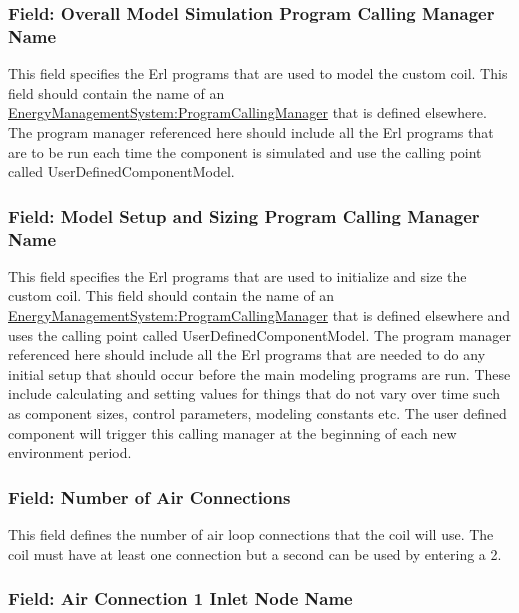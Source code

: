 \subsubsection{Field: Overall Model Simulation Program Calling Manager Name}\label{field-overall-model-simulation-program-calling-manager-name-2}

This field specifies the Erl programs that are used to model the custom coil. This field should contain the name of an \hyperref[energymanagementsystemprogramcallingmanager]{\hyperref[energymanagementsystemprogram]{EnergyManagementSystem:Program}CallingManager} that is defined elsewhere. The program manager referenced here should include all the Erl programs that are to be run each time the component is simulated and use the calling point called UserDefinedComponentModel.

\subsubsection{Field: Model Setup and Sizing Program Calling Manager Name}\label{field-model-setup-and-sizing-program-calling-manager-name-2}

This field specifies the Erl programs that are used to initialize and size the custom coil. This field should contain the name of an \hyperref[energymanagementsystemprogramcallingmanager]{\hyperref[energymanagementsystemprogram]{EnergyManagementSystem:Program}CallingManager} that is defined elsewhere and uses the calling point called UserDefinedComponentModel. The program manager referenced here should include all the Erl programs that are needed to do any initial setup that should occur before the main modeling programs are run. These include calculating and setting values for things that do not vary over time such as component sizes, control parameters, modeling constants etc. The user defined component will trigger this calling manager at the beginning of each new environment period.

\subsubsection{Field: Number of Air Connections}\label{field-number-of-air-connections}

This field defines the number of air loop connections that the coil will use. The coil must have at least one connection but a second can be used by entering a 2.

\subsubsection{Field: Air Connection 1 Inlet Node Name}\label{field-air-connection-1-inlet-node-name}

